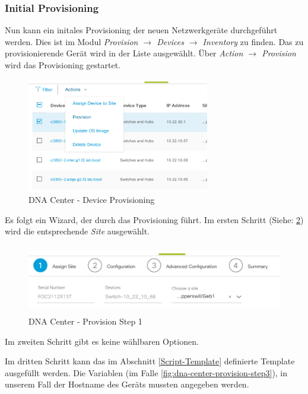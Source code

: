 \subsubsection{Initial Provisioning}

Nun kann ein initales Provisioning der neuen Netzwerkgeräte durchgeführt werden. Dies ist im Modul \textit{Provision $\rightarrow$ Devices $\rightarrow$ Inventory} zu finden.
Das zu provisionierende Gerät wird in der Liste ausgewählt. Über \textit{Action $\rightarrow$ Provision} wird das Provisioning gestartet. 

\begin{figure}[H]
	\centering
	\includegraphics[height=5cm]{img/secondtry/dna-center-provision-device.png}
	\caption{DNA Center - Device Provisioning}
	\label{fig:dna-center-provision-device}
\end{figure}

Es folgt ein Wizard, der durch das Provisioning führt. Im ersten Schritt (Siehe: \ref{fig:dna-center-provision-step1}) wird die entsprechende \textit{Site} ausgewählt. 

\begin{figure}[H]
	\centering
	\includegraphics[height=3cm]{img/secondtry/dna-center-provision-step1.png}
	\caption{DNA Center - Provision Step 1}
	\label{fig:dna-center-provision-step1}
\end{figure}

Im zweiten Schritt gibt es keine wählbaren Optionen.

Im dritten Schritt kann das im Abschnitt \ref{Script-Template} definierte Template ausgefüllt werden. Die Variablen (im Falle \ref{fig:dna-center-provision-step3}), in unserem Fall der Hostname des Geräts mussten angegeben werden.


